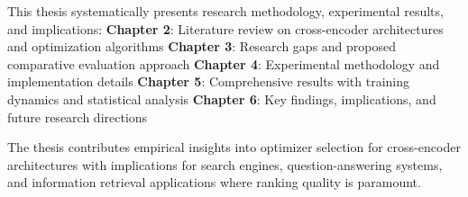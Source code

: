This thesis systematically presents research methodology, experimental results, and implications:
\textbf{Chapter 2}: Literature review on cross-encoder architectures and optimization algorithms
\textbf{Chapter 3}: Research gaps and proposed comparative evaluation approach  
\textbf{Chapter 4}: Experimental methodology and implementation details
\textbf{Chapter 5}: Comprehensive results with training dynamics and statistical analysis
\textbf{Chapter 6}: Key findings, implications, and future research directions

The thesis contributes empirical insights into optimizer selection for cross-encoder architectures with implications for search engines, question-answering systems, and information retrieval applications where ranking quality is paramount.
